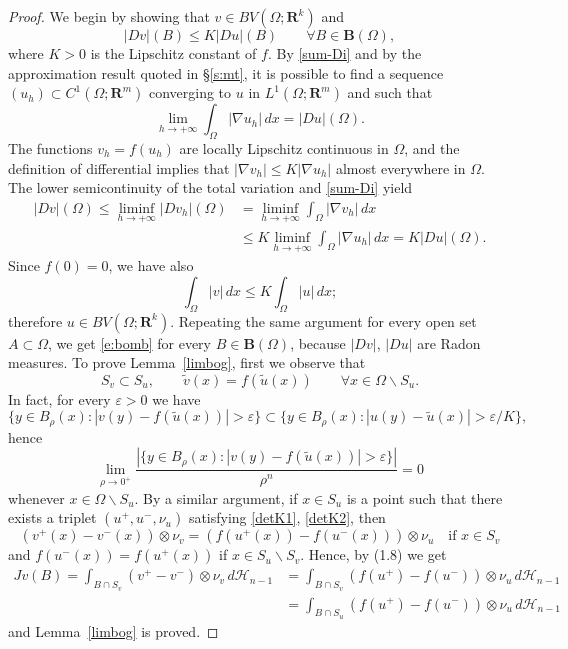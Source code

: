 \documentclass{article}
\theoremstyle{definition}
\theoremstyle{remark}
\newcommand{\secref}[1]{\S\ref{#1}}
\newcommand{\lemref}[1]{Lemma~\ref{#1}}
\newcommand{\envert}[1]{\left\lvert#1\right\rvert}
\let\abs=\envert
\begin{document}
\begin{proof}
 We begin by showing that $v\in BV(\Omega;\mathbf{R}^k)$ and
\begin{equation}\label{e:bomb}
\abs{Dv}(B)\le K\abs{Du}(B)\qquad\forall B\in\mathbf{B}(\Omega ),
\end{equation}
where $K>0$ is the Lipschitz constant of $f$. By \eqref{sum-Di} and by
the approximation result quoted in \secref{s:mt}, it is possible to find
a sequence $(u_h)\subset C^1(\Omega ;\mathbf{R}^m)$ converging to $u$ in
$L^1(\Omega ;\mathbf{R}^m)$ and such that
\[\lim_{h\to +\infty}\int_\Omega \abs{\nabla u_h}\,dx=\abs{Du}(\Omega ).\]
The functions $v_h=f(u_h)$ are locally Lipschitz continuous in $\Omega
$, and the definition of differential implies that $\abs{\nabla v_h}\le
K\abs{\nabla u_h}$ almost everywhere in $\Omega $. The lower semicontinuity
of the total variation and \eqref{sum-Di} yield
\begin{equation}
\begin{split}
\abs{Dv}(\Omega )\le\liminf_{h\to +\infty}\abs{Dv_h}(\Omega) &
=\liminf_{h\to +\infty}\int_\Omega \abs{\nabla v_h}\,dx\\
&\le K\liminf_{h\to +\infty}\int_\Omega
\abs{\nabla u_h}\,dx=K\abs{Du}(\Omega).
\end{split}\end{equation}
Since $f(0)=0$, we have also
\[\int_\Omega \abs{v}\,dx\le K\int_\Omega \abs{u}\,dx;\]
therefore $u\in BV(\Omega ;\mathbf{R}^k)$. Repeating the same argument
for every open set $A\subset\Omega $, we get \eqref{e:bomb} for every
$B\in\mathbf{B}(\Omega)$, because $\abs{Dv}$, $\abs{Du}$ are Radon measures. To
prove \lemref{limbog}, first we observe that
\begin{equation}\label{e:SS}
S_v\subset S_u,\qquad\tilde v(x)=f(\tilde u(x))\qquad \forall x\in\Omega
\backslash S_u.\end{equation}
In fact, for every $\varepsilon >0$ we have
\[\{y\in B_\rho(x): \abs{v(y)-f(\tilde u(x))}>\varepsilon \}\subset \{y\in
B_\rho(x): \abs{u(y)-\tilde u(x)}>\varepsilon /K\},\]
hence
\[\lim_{\rho\to 0^+}\frac{\abs{\{y\in B_\rho(x): \abs{v(y)-f(\tilde u(x))}>
\varepsilon \}}}{\rho^n}=0\]
whenever $x\in\Omega \backslash S_u$. By a similar argument, if $x\in
S_u$ is a point such that there exists a triplet $(u^+,u^-,\nu_u)$
satisfying \eqref{detK1}, \eqref{detK2}, then
\[
(v^+(x)-v^-(x))\otimes \nu_v=(f(u^+(x))-f(u^-(x)))\otimes\nu_u\quad
\text{if }x\in S_v
\]
and $f(u^-(x))=f(u^+(x))$ if $x\in S_u\backslash S_v$. Hence, by (1.8)
we get
\begin{equation*}\begin{split}
Jv(B)=\int_{B\cap S_v}(v^+-v^-)\otimes \nu_v\,d\mathcal{H}_{n-1}&=
\int_{B\cap S_v}(f(u^+)-f(u^-))\otimes \nu_u\,d\mathcal{H}_{n-1}\\
&=\int_{B\cap S_u}(f(u^+)-f(u^-))\otimes \nu_u\,d\mathcal{H}_{n-1}
\end{split}\end{equation*}
and \lemref{limbog} is proved.
\end{proof}
\end{document}
